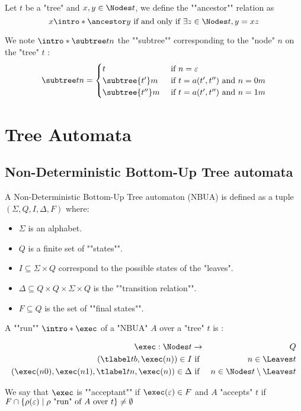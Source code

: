 \documentclass{article}
\begin{document}
\begin{definition}
	Let $t$ be a "tree" and $x, y \in \Nodes t$, we define the ""ancestor"" relation as
	\[  x \intro* \ancestor y \tiff \exists z \in \Nodes t, y = xz \]
\end{definition}


\begin{definition}
	We note $\intro* \subtree t n$ the ""subtree"" corresponding to the "node" $n$ on the "tree" $t$ :
	\[
		\subtree t n =   \begin{cases}
			t                & \text{ if }  n = \varepsilon                  \\
			\subtree {t'} m  & \text{ if } t = a(t',t'') \text{ and } n = 0m \\
			\subtree {t''} m & \text{ if } t = a(t',t'') \text{ and } n = 1m
		\end{cases}
	\]
\end{definition}


\section{Tree Automata}
\subsection{Non-Deterministic Bottom-Up Tree automata}

\begin{definition}
	A Non-Deterministic Bottom-Up Tree automaton (NBUA) is defined as a tuple
	$(\Sigma, Q, I, \Delta, F)$ where:
	\begin{itemize}
		\item $\Sigma$ is an alphabet.
		\item $Q$ is a finite set of ""states"".
		\item $I \subseteq \Sigma \times Q$ correspond to the possible states of the "leaves".
		\item $\Delta \subseteq Q \times Q \times \Sigma \times Q$ is the ""transition relation"".
		\item $F \subseteq Q$ is the set of ""final states"".
	\end{itemize}
\end{definition}

\begin{definition}
	A ""run"" $\intro* \exec$ of a "NBUA" $A$ over a "tree" $t$ is :

	\begin{eqnarray*}
		\exec : \Nodes t &\to& Q \\
		(\tlabel t b,  \exec (n) ) \in I &\text{ if }& n \in \Leaves t \\
		(\exec (n0), \exec (n1), \tlabel t n, \exec (n)) \in \Delta &\text{ if }& n \in \Nodes t \setminus \Leaves t
	\end{eqnarray*}

	We say that $\exec$ is ""acceptant"" if $\exec (\varepsilon) \in F$ and $A$ "accepts" $t$ if
	$F \cap \left\{\rho(\varepsilon) \mid \text{$\rho$ "run" of~$A$ over~$t$}\right\} \neq \emptyset$
\end{definition}
\end{document}
